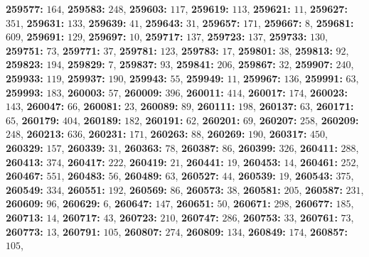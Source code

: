 \textsf{\bfseries 259577:} $164$, \textsf{\bfseries 259583:} $248$, \textsf{\bfseries 259603:} $117$, \textsf{\bfseries 259619:} $113$, \textsf{\bfseries 259621:} $11$, \textsf{\bfseries 259627:} $351$, \textsf{\bfseries 259631:} $133$, \textsf{\bfseries 259639:} $41$, \textsf{\bfseries 259643:} $31$, \textsf{\bfseries 259657:} $171$, \textsf{\bfseries 259667:} $8$, \textsf{\bfseries 259681:} $609$, \textsf{\bfseries 259691:} $129$, \textsf{\bfseries 259697:} $10$, \textsf{\bfseries 259717:} $137$, \textsf{\bfseries 259723:} $137$, \textsf{\bfseries 259733:} $130$, \textsf{\bfseries 259751:} $73$, \textsf{\bfseries 259771:} $37$, \textsf{\bfseries 259781:} $123$, \textsf{\bfseries 259783:} $17$, \textsf{\bfseries 259801:} $38$, \textsf{\bfseries 259813:} $92$, \textsf{\bfseries 259823:} $194$, \textsf{\bfseries 259829:} $7$, \textsf{\bfseries 259837:} $93$, \textsf{\bfseries 259841:} $206$, \textsf{\bfseries 259867:} $32$, \textsf{\bfseries 259907:} $240$, \textsf{\bfseries 259933:} $119$, \textsf{\bfseries 259937:} $190$, \textsf{\bfseries 259943:} $55$, \textsf{\bfseries 259949:} $11$, \textsf{\bfseries 259967:} $136$, \textsf{\bfseries 259991:} $63$, \textsf{\bfseries 259993:} $183$, \textsf{\bfseries 260003:} $57$, \textsf{\bfseries 260009:} $396$, \textsf{\bfseries 260011:} $414$, \textsf{\bfseries 260017:} $174$, \textsf{\bfseries 260023:} $143$, \textsf{\bfseries 260047:} $66$, \textsf{\bfseries 260081:} $23$, \textsf{\bfseries 260089:} $89$, \textsf{\bfseries 260111:} $198$, \textsf{\bfseries 260137:} $63$, \textsf{\bfseries 260171:} $65$, \textsf{\bfseries 260179:} $404$, \textsf{\bfseries 260189:} $182$, \textsf{\bfseries 260191:} $62$, \textsf{\bfseries 260201:} $69$, \textsf{\bfseries 260207:} $258$, \textsf{\bfseries 260209:} $248$, \textsf{\bfseries 260213:} $636$, \textsf{\bfseries 260231:} $171$, \textsf{\bfseries 260263:} $88$, \textsf{\bfseries 260269:} $190$, \textsf{\bfseries 260317:} $450$, \textsf{\bfseries 260329:} $157$, \textsf{\bfseries 260339:} $31$, \textsf{\bfseries 260363:} $78$, \textsf{\bfseries 260387:} $86$, \textsf{\bfseries 260399:} $326$, \textsf{\bfseries 260411:} $288$, \textsf{\bfseries 260413:} $374$, \textsf{\bfseries 260417:} $222$, \textsf{\bfseries 260419:} $21$, \textsf{\bfseries 260441:} $19$, \textsf{\bfseries 260453:} $14$, \textsf{\bfseries 260461:} $252$, \textsf{\bfseries 260467:} $551$, \textsf{\bfseries 260483:} $56$, \textsf{\bfseries 260489:} $63$, \textsf{\bfseries 260527:} $44$, \textsf{\bfseries 260539:} $19$, \textsf{\bfseries 260543:} $375$, \textsf{\bfseries 260549:} $334$, \textsf{\bfseries 260551:} $192$, \textsf{\bfseries 260569:} $86$, \textsf{\bfseries 260573:} $38$, \textsf{\bfseries 260581:} $205$, \textsf{\bfseries 260587:} $231$, \textsf{\bfseries 260609:} $96$, \textsf{\bfseries 260629:} $6$, \textsf{\bfseries 260647:} $147$, \textsf{\bfseries 260651:} $50$, \textsf{\bfseries 260671:} $298$, \textsf{\bfseries 260677:} $185$, \textsf{\bfseries 260713:} $14$, \textsf{\bfseries 260717:} $43$, \textsf{\bfseries 260723:} $210$, \textsf{\bfseries 260747:} $286$, \textsf{\bfseries 260753:} $33$, \textsf{\bfseries 260761:} $73$, \textsf{\bfseries 260773:} $13$, \textsf{\bfseries 260791:} $105$, \textsf{\bfseries 260807:} $274$, \textsf{\bfseries 260809:} $134$, \textsf{\bfseries 260849:} $174$, \textsf{\bfseries 260857:} $105$, 

